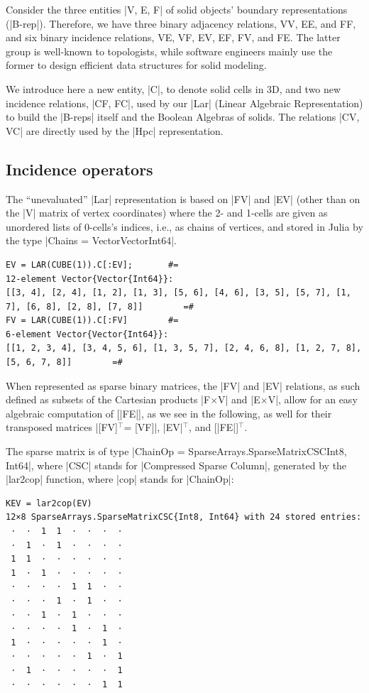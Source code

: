 Consider the three entities |V, E, F| of solid objects' boundary representations (|B-rep|).
Therefore, we have three binary adjacency relations, VV, EE, and FF, and six binary incidence relations, VE, VF, EV, EF, FV, and FE. The latter group is well-known to topologists, while software engineers mainly use the former to design efficient data structures for solid modeling.

We introduce here a new entity, |C|, to denote solid cells in 3D, and two new incidence relations, |CF, FC|, used by our |Lar| (Linear Algebraic Representation) to build the |B-reps| itself and the Boolean Algebras of solids. The relations |CV, VC| are directly used by the |Hpc| representation.

\subsection{Incidence operators}\label{sect:5-2-1}

The “unevaluated” |Lar| representation is based on |FV| and |EV| (other than on the |V| matrix of vertex coordinates) where the 2- and 1-cells are given as unordered lists of 0-cells’s indices, i.e., as chains of vertices, and stored in Julia by the type |Chains = Vector{Vector{Int64}}|.
\begin{lstlisting}[language=JuliaLocal, style=julia, mathescape=true]
EV = LAR(CUBE(1)).C[:EV];		#=
12-element Vector{Vector{Int64}}:	
[[3, 4], [2, 4], [1, 2], [1, 3], [5, 6], [4, 6], [3, 5], [5, 7], [1, 7], [6, 8], [2, 8], [7, 8]]		=#
FV = LAR(CUBE(1)).C[:FV]		#=
6-element Vector{Vector{Int64}}:
[[1, 2, 3, 4], [3, 4, 5, 6], [1, 3, 5, 7], [2, 4, 6, 8], [1, 2, 7, 8], [5, 6, 7, 8]]		=#
\end{lstlisting}

When represented as sparse binary matrices, the |FV| and |EV| relations, as such defined as subsets of the Cartesian products |F$\times$V| and |E$\times$V|, allow for an easy algebraic computation of [|FE|], as we see in the following, as well for their transposed matrices |[FV]$^\top$= [VF]|,  |EV|$^\top$, and [|FE|]$^\top$.

The sparse matrix is of type
|ChainOp = SparseArrays.SparseMatrixCSC{Int8, Int64}|, where |CSC| stands for |Compressed Sparse Column|, generated by the |lar2cop| function, where |cop| stands for |ChainOp|:

\begin{lstlisting}[language=JuliaLocal, style=julia, mathescape=true]
KEV = lar2cop(EV)
12×8 SparseArrays.SparseMatrixCSC{Int8, Int64} with 24 stored entries:
 ⋅  ⋅  1  1  ⋅  ⋅  ⋅  ⋅
 ⋅  1  ⋅  1  ⋅  ⋅  ⋅  ⋅
 1  1  ⋅  ⋅  ⋅  ⋅  ⋅  ⋅
 1  ⋅  1  ⋅  ⋅  ⋅  ⋅  ⋅
 ⋅  ⋅  ⋅  ⋅  1  1  ⋅  ⋅
 ⋅  ⋅  ⋅  1  ⋅  1  ⋅  ⋅
 ⋅  ⋅  1  ⋅  1  ⋅  ⋅  ⋅
 ⋅  ⋅  ⋅  ⋅  1  ⋅  1  ⋅
 1  ⋅  ⋅  ⋅  ⋅  ⋅  1  ⋅
 ⋅  ⋅  ⋅  ⋅  ⋅  1  ⋅  1
 ⋅  1  ⋅  ⋅  ⋅  ⋅  ⋅  1
 ⋅  ⋅  ⋅  ⋅  ⋅  ⋅  1  1
\end{lstlisting}


